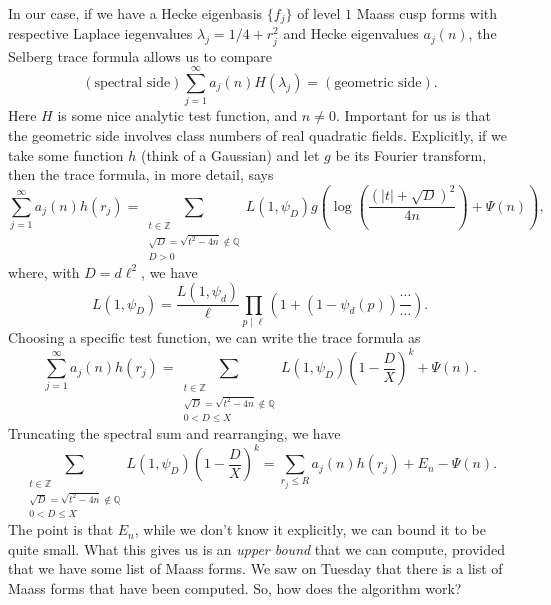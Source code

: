 \documentclass[reqno]{amsart} 
\begin{document}
In our case, if we have a Hecke eigenbasis $\{f_j\}$ of level $1$ Maass cusp forms with respective Laplace iegenvalues $\lambda_j = 1/4 + r_j^2$ and Hecke eigenvalues $a_j(n)$, the Selberg trace formula allows us to compare
\begin{equation*}
  (\text{spectral side}) \sum_{j = 1}^\infty a_j(n) H(\lambda_j) =(\text{geometric side}).
\end{equation*}
Here $H$ is some nice analytic test function, and $n \neq 0$.  Important for us is that the geometric side involves class numbers of real quadratic fields.  Explicitly, if we take some function $h$ (think of a Gaussian) and let $g$ be its Fourier transform, then the trace formula, in more detail, says
\begin{equation*}
  \sum_{j = 1}^\infty a_j(n) h(r_j)
  = \sum_{
    \substack{
      t \in \mathbb{Z}   \\
      \sqrt{D} = \sqrt{t^2 - 4 n} \notin \mathbb{Q}      \\
      D > 0
    }
  }
  L(1, \psi_D) g \left( \log \left( \frac{(\lvert t \rvert + \sqrt{D})^2}{4 n} \right)
    + \Psi(n)\right),
\end{equation*}
where, with $D = d \ell^2$, we have
\begin{equation*}
  L(1, \psi_D) = \frac{L(1, \psi_d)}{ \ell} \prod_{p \mid \ell}
  \left( 1 +(1 - \psi_d(p)) \frac{\dotsb}{\dotsb} \right).
\end{equation*}
Choosing a specific test function, we can write the trace formula as
\begin{equation*}
  \sum_{j = 1}^\infty a_j(n) h(r_j)
  = \sum_{
    \substack{
      t \in \mathbb{Z}  \\
      \sqrt{D} = \sqrt{t^2 - 4 n} \notin \mathbb{Q}
      \\
      0 < D \leq X
    }
  }
  L(1, \psi_D) \left( 1 - \frac{D}{X} \right)^k  + \Psi(n).
\end{equation*}
Truncating the spectral sum and rearranging, we have
\begin{equation}\label{eq:cnojsyvbb3}
  \sum_{
    \substack{
      t \in \mathbb{Z}  \\
      \sqrt{D} = \sqrt{t^2 - 4 n} \notin \mathbb{Q} \\ 0 < D \leq X
    }
  } L(1, \psi_D) \left( 1 - \frac{D}{X} \right)^k =
  \sum_{r_j \leq R}
  a_j(n) h(r_j) + E_n - \Psi(n).
\end{equation}
The point is that $E_n$, while we don't know it explicitly, we can bound it to be quite small.  What this gives us is an \emph{upper bound} that we can compute, provided that we have some list of Maass forms.  We saw on Tuesday that there is a list of Maass forms that have been computed.  So, how does the algorithm work?
\end{document}
